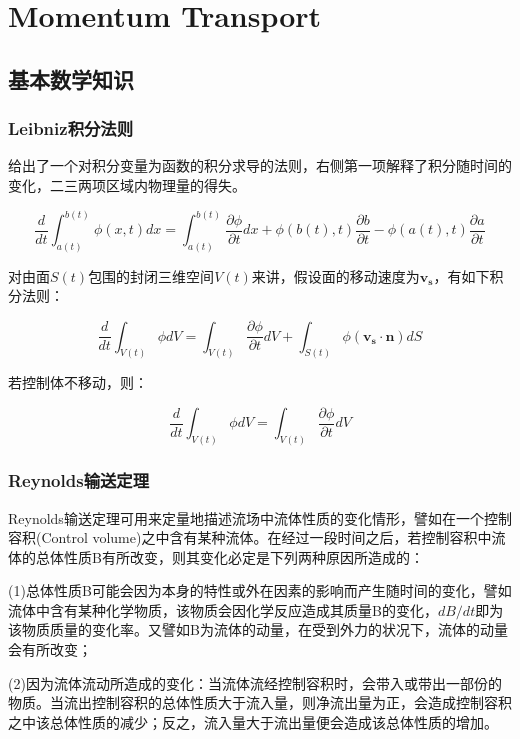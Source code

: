 \chapter{Momentum Transport}

\section{基本数学知识}
\subsection{Leibniz积分法则}

给出了一个对积分变量为函数的积分求导的法则，右侧第一项解释了积分随时间的变化，二三两项区域内物理量的得失。

\begin{equation}
    \frac{d}{dt} \int_{a(t)}^{b(t)} \phi(x,t) dx = \int_{a(t)}^{b(t)} \frac{\partial \phi}{\partial t} dx + \phi(b(t),t) \frac{\partial b}{\partial t} - \phi(a(t),t)\frac{\partial a}{\partial t}
\end{equation}

对由面$ S(t) $包围的封闭三维空间$ V(t) $来讲，假设面的移动速度为$ \mathbf{v_s} $，有如下积分法则：

\begin{equation}
    \frac{d}{dt} \int_{V(t)} \phi dV = \int_{V(t)} \frac{\partial \phi}{\partial t} dV + \int_{S(t)} \phi(\mathbf{v_s}\cdot \mathbf{n}) dS
\end{equation}

若控制体不移动，则：

\begin{equation}\label{Leibniz}
\frac{d}{dt} \int_{V(t)} \phi dV = \int_{V(t)} \frac{\partial \phi}{\partial t} dV
\end{equation}

\subsection{Reynolds输送定理}
Reynolds输送定理可用来定量地描述流场中流体性质的变化情形，譬如在一个控制容积(Control volume)之中含有某种流体。在经过一段时间之后，若控制容积中流体的总体性质B有所改变，则其变化必定是下列两种原因所造成的：

(1)总体性质B可能会因为本身的特性或外在因素的影响而产生随时间的变化，譬如流体中含有某种化学物质，该物质会因化学反应造成其质量B的变化，$ dB/dt $即为该物质质量的变化率。又譬如B为流体的动量，在受到外力的状况下，流体的动量会有所改变；

(2)因为流体流动所造成的变化：当流体流经控制容积时，会带入或带出一部份的物质。当流出控制容积的总体性质大于流入量，则净流出量为正，会造成控制容积之中该总体性质的减少；反之，流入量大于流出量便会造成该总体性质的增加。



